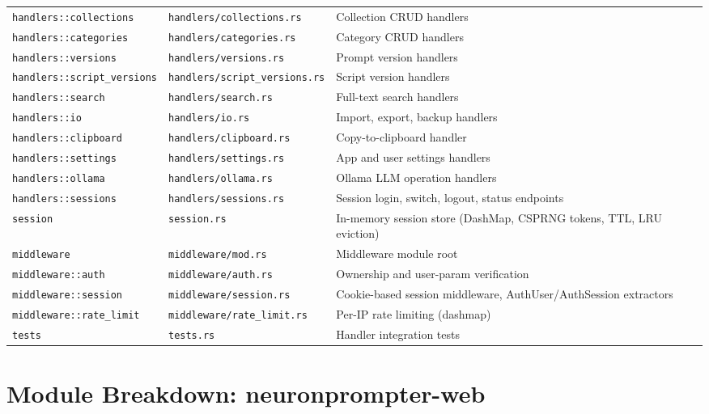 \documentclass[a4paper, 11pt, oneside]{report}
\begin{document}
{\begin{longtable}{L{4cm} L{4.8cm} L{5.8cm}}
  \texttt{handlers::collections}  & \texttt{handlers/collections.rs}& Collection CRUD handlers \\
  \texttt{handlers::categories}   & \texttt{handlers/categories.rs} & Category CRUD handlers \\
  \texttt{handlers::versions}     & \texttt{handlers/versions.rs}   & Prompt version handlers \\
  \texttt{handlers::script\_\-versions} & \texttt{handlers/script\_versions.rs} & Script version handlers \\
  \texttt{handlers::search}       & \texttt{handlers/search.rs}     & Full-text search handlers \\
  \texttt{handlers::io}           & \texttt{handlers/io.rs}         & Import, export, backup handlers \\
  \texttt{handlers::clipboard}    & \texttt{handlers/clipboard.rs}  & Copy-to-clipboard handler \\
  \texttt{handlers::settings}     & \texttt{handlers/settings.rs}   & App and user settings handlers \\
  \texttt{handlers::ollama}       & \texttt{handlers/ollama.rs}     & Ollama LLM operation handlers \\
  \texttt{handlers::sessions}    & \texttt{handlers/sessions.rs}   & Session login, switch, logout, status endpoints \\
  \texttt{session}               & \texttt{session.rs}             & In-memory session store (DashMap, CSPRNG tokens, TTL, LRU eviction) \\
  \texttt{middleware}             & \texttt{middleware/mod.rs}       & Middleware module root \\
  \texttt{middleware::auth}       & \texttt{middleware/auth.rs}      & Ownership and user-param verification \\
  \texttt{middleware::session}    & \texttt{middleware/session.rs}   & Cookie-based session middleware, AuthUser/AuthSession extractors \\
  \texttt{middleware::rate\_limit}& \texttt{middleware/rate\_limit.rs} & Per-IP rate limiting (dashmap) \\
  \texttt{tests}                & \texttt{tests.rs}               & Handler integration tests \\
  \bottomrule
\end{longtable}
}

\section{Module Breakdown: neuronprompter-web}
\label{sec:mod-web}
\end{document}
